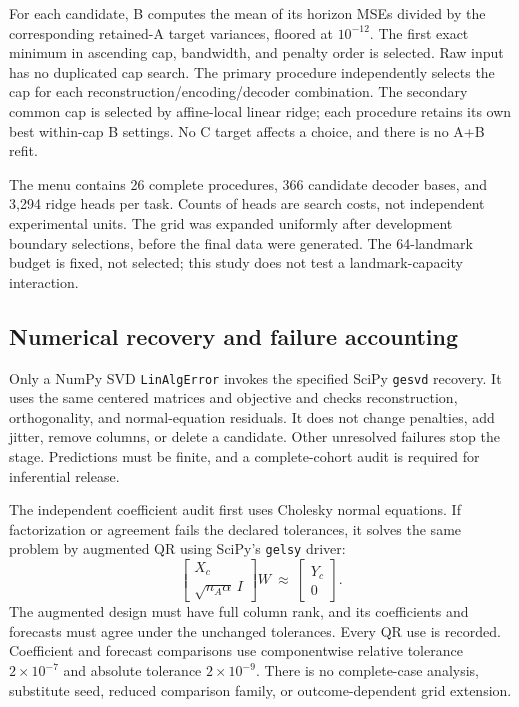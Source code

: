 For each candidate, B computes the mean of its horizon MSEs divided by the corresponding retained-A target variances, floored at $10^{-12}$. The first exact minimum in ascending cap, bandwidth, and penalty order is selected. Raw input has no duplicated cap search. The primary procedure independently selects the cap for each reconstruction/encoding/decoder combination. The secondary common cap is selected by affine-local linear ridge; each procedure retains its own best within-cap B settings. No C target affects a choice, and there is no A+B refit.

The menu contains 26 complete procedures, 366 candidate decoder bases, and 3,294 ridge heads per task. Counts of heads are search costs, not independent experimental units. The grid was expanded uniformly after development boundary selections, before the final data were generated. The 64-landmark budget is fixed, not selected; this study does not test a landmark-capacity interaction.

\subsection{Numerical recovery and failure accounting}
Only a NumPy SVD \texttt{LinAlgError} invokes the specified SciPy \texttt{gesvd} recovery. It uses the same centered matrices and objective and checks reconstruction, orthogonality, and normal-equation residuals. It does not change penalties, add jitter, remove columns, or delete a candidate. Other unresolved failures stop the stage. Predictions must be finite, and a complete-cohort audit is required for inferential release.

The independent coefficient audit first uses Cholesky normal equations. If factorization or agreement fails the declared tolerances, it solves the same problem by augmented QR using SciPy's \texttt{gelsy} driver:
\[
 \begin{bmatrix}X_c\\\sqrt{n_A\alpha}\,I\end{bmatrix}W
 \ \approx\ \begin{bmatrix}Y_c\\0\end{bmatrix}.
\]
The augmented design must have full column rank, and its coefficients and forecasts must agree under the unchanged tolerances. Every QR use is recorded. Coefficient and forecast comparisons use componentwise relative tolerance $2\times10^{-7}$ and absolute tolerance $2\times10^{-9}$. There is no complete-case analysis, substitute seed, reduced comparison family, or outcome-dependent grid extension.
